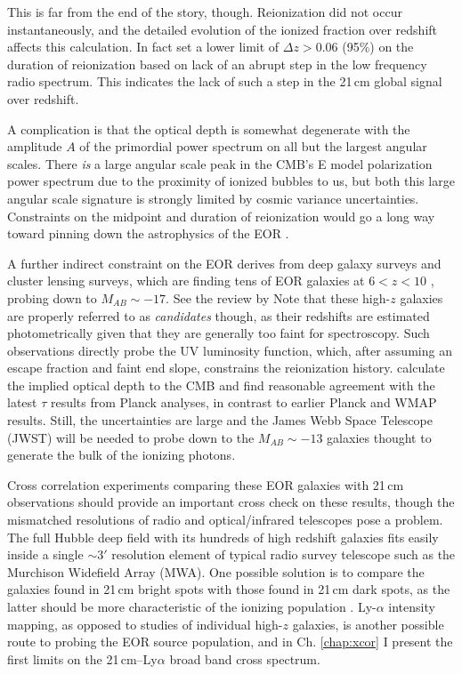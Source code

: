 This is far from the end of the story, though. Reionization did not occur instantaneously, and the detailed evolution of the ionized fraction over redshift affects this calculation. In fact \citet{bowman2010} set a lower limit of $\Delta z>0.06$ (95\%) on the duration of reionization based on lack of an abrupt step in the low frequency radio spectrum. This indicates the lack of such a step in the 21\,cm global signal over redshift. 

A complication is that the optical depth is somewhat degenerate with the amplitude $A$ of the primordial power spectrum on all but the largest angular scales. There \textit{is} a large angular scale peak in the CMB's E model polarization power spectrum due to the proximity of ionized bubbles to us, but both this large angular scale signature is strongly limited by cosmic variance uncertainties. Constraints on the midpoint and duration of reionization would go a long way toward pinning down the astrophysics of the EOR \citep{liu15a}.

A further indirect constraint on the EOR derives from deep galaxy surveys and cluster lensing surveys, which are finding tens of EOR galaxies at $6<z<10$ \citep{Bouwens2011,Illingworth2013,Dunlop2013}, probing down to $M_{AB}\sim-17$. See the review by \citet{madau14review} Note that these high-$z$ galaxies are properly referred to as \textit{candidates} though, as their redshifts are estimated photometrically given that they are generally too faint for spectroscopy. Such observations directly probe the UV luminosity function, which, after assuming an escape fraction and faint end slope, constrains the reionization history. \citet{RobertsonReionization2015} calculate the implied optical depth to the CMB and find reasonable agreement with the latest $\tau$ results from Planck analyses, in contrast to earlier Planck \citep{Robertson2013} and WMAP \citep{hinshaw_et_al_2012} results. Still, the uncertainties are large and the James Webb Space Telescope (JWST) will be needed to probe down to the $M_{AB}\sim-13$ galaxies thought to generate the bulk of the ionizing photons.

Cross correlation experiments comparing these EOR galaxies with 21\,cm observations should provide an important cross check on these results, though the mismatched resolutions of radio and optical/infrared telescopes pose a problem. The full Hubble deep field with its hundreds of high redshift galaxies fits easily inside a single $\sim3'$ resolution element of typical radio survey telescope such as the Murchison Widefield Array (MWA). One possible solution is to compare the galaxies found in 21\,cm bright spots with those found in 21\,cm dark spots, as the latter should be more characteristic of the ionizing population \citep{beardsley15}. Ly-$\alpha$ intensity mapping, as opposed to studies of individual high-$z$ galaxies, is another possible route to probing the EOR source population, and in Ch. \ref{chap:xcor} I present the first limits on the 21\,cm--Ly$\alpha$ broad band cross spectrum.

